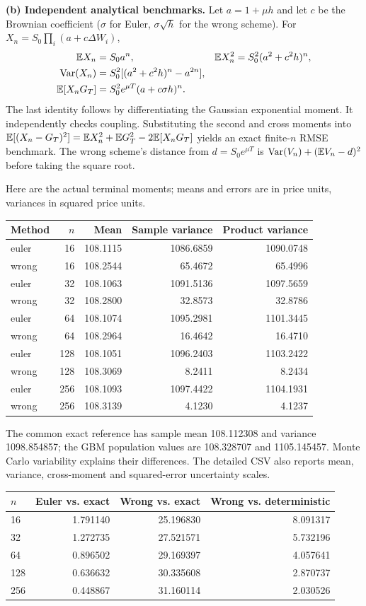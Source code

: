 \textbf{(b) Independent analytical benchmarks.} Let $a=1+\mu h$ and let $c$ be the Brownian coefficient ($\sigma$ for Euler, $\sigma\sqrt h$ for the wrong scheme). For $X_n=S_0\prod_i(a+c\Delta W_i)$,
\begin{align*}
 \mathbb E X_n&=S_0a^n,&\mathbb E X_n^2&=S_0^2(a^2+c^2h)^n,\\
 \operatorname{Var}(X_n)&=S_0^2[(a^2+c^2h)^n-a^{2n}],\\
 \mathbb E[X_nG_T]&=S_0^2e^{\mu T}(a+c\sigma h)^n.
\end{align*}
The last identity follows by differentiating the Gaussian exponential moment. It independently checks coupling. Substituting the second and cross moments into
$\mathbb E[(X_n-G_T)^2]=\mathbb E X_n^2+\mathbb E G_T^2-2\mathbb E[X_nG_T]$ yields an exact finite-$n$ RMSE benchmark. The wrong scheme's distance from $d=S_0e^{\mu T}$ is $\operatorname{Var}(V_n)+(\mathbb E V_n-d)^2$ before taking the square root.

Here are the actual terminal moments; means and errors are in price units, variances in squared price units.
\begin{center}
\begin{tabular}{lrrrr}
\toprule
Method & $n$ & Mean & Sample variance & Product variance\\\midrule
euler & 16 & 108.1115 & 1086.6859 & 1090.0748\\
wrong & 16 & 108.2544 & 65.4672 & 65.4996\\
euler & 32 & 108.1063 & 1091.5136 & 1097.5659\\
wrong & 32 & 108.2800 & 32.8573 & 32.8786\\
euler & 64 & 108.1074 & 1095.2981 & 1101.3445\\
wrong & 64 & 108.2964 & 16.4642 & 16.4710\\
euler & 128 & 108.1051 & 1096.2403 & 1103.2422\\
wrong & 128 & 108.3069 & 8.2411 & 8.2434\\
euler & 256 & 108.1093 & 1097.4422 & 1104.1931\\
wrong & 256 & 108.3139 & 4.1230 & 4.1237\\
\bottomrule
\end{tabular}
\end{center}

The common exact reference has sample mean 108.112308 and variance 1098.854857; the GBM population values are 108.328707 and 1105.145457. Monte Carlo variability explains their differences. The detailed CSV also reports mean, variance, cross-moment and squared-error uncertainty scales.
\begin{center}
\begin{tabular}{lrrr}
\toprule
$n$ & Euler vs. exact & Wrong vs. exact & Wrong vs. deterministic\\\midrule
16 & 1.791140 & 25.196830 & 8.091317\\
32 & 1.272735 & 27.521571 & 5.732196\\
64 & 0.896502 & 29.169397 & 4.057641\\
128 & 0.636632 & 30.335608 & 2.870737\\
256 & 0.448867 & 31.160114 & 2.030526\\
\bottomrule
\end{tabular}
\end{center}

